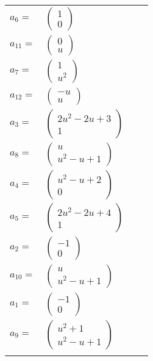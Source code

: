 \documentclass[1p]{elsarticle_modified}
\theoremstyle{definition}
\begin{document}
\begin{tabular}{m{7pt} m{180pt} m{7pt} m{180pt} }
\flushright $a_{6}=$&$\begin{pmatrix}1\\0\end{pmatrix}$ \\
\flushright $a_{11}=$&$\begin{pmatrix}0\\u\end{pmatrix}$ \\
\flushright $a_{7}=$&$\begin{pmatrix}1\\u^2\end{pmatrix}$ \\
\flushright $a_{12}=$&$\begin{pmatrix}- u\\u\end{pmatrix}$ \\
\flushright $a_{3}=$&$\begin{pmatrix}2 u^2-2 u+3\\1\end{pmatrix}$ \\
\flushright $a_{8}=$&$\begin{pmatrix}u\\u^2- u+1\end{pmatrix}$ \\
\flushright $a_{4}=$&$\begin{pmatrix}u^2- u+2\\0\end{pmatrix}$ \\
\flushright $a_{5}=$&$\begin{pmatrix}2 u^2-2 u+4\\1\end{pmatrix}$ \\
\flushright $a_{2}=$&$\begin{pmatrix}-1\\0\end{pmatrix}$ \\
\flushright $a_{10}=$&$\begin{pmatrix}u\\u^2- u+1\end{pmatrix}$ \\
\flushright $a_{1}=$&$\begin{pmatrix}-1\\0\end{pmatrix}$ \\
\flushright $a_{9}=$&$\begin{pmatrix}u^2+1\\u^2- u+1\end{pmatrix}$\\&\end{tabular}
\end{document}
